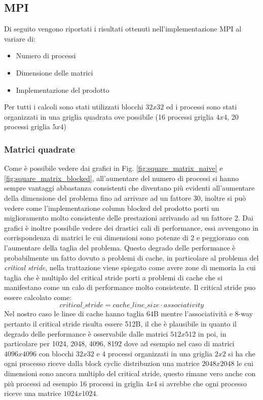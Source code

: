 \documentclass[conference]{IEEEtran}
\begin{document}
\subsection{MPI}
Di seguito vengono riportati i risultati ottenuti nell'implementazione MPI al variare di:
\begin{itemize}
    \item Numero di processi
    \item Dimensione delle matrici
    \item Implementazione del prodotto
\end{itemize}
Per tutti i calcoli sono stati utilizzati blocchi $32x32$ ed i processi sono stati organizzati in una griglia quadrata ove possibile (16 processi griglia $4x4$, 20 processi griglia $5x4$)

\subsubsection{Matrici quadrate}
Come è possibile vedere dai grafici in Fig. \ref{fig:square_matrix_naive} e \ref{fig:square_matrix_blocked}, all'aumentare del numero di processi si hanno sempre vantaggi abbastanza consistenti che diventano più evidenti all'aumentare della dimensione del problema fino ad arrivare ad un fattore 30, inoltre si può vedere come l'implementazione column blocked del prodotto porti un miglioramento molto consistente delle prestazioni arrivando ad un fattore 2. Dai grafici è inoltre possibile vedere dei drastici cali di performance, essi avvengono in corrispondenza di matrici le cui dimensioni sono potenze di 2 e peggiorano con l'aumentare della taglia del problema. Questo degrado delle performance è probabilmente un fatto dovuto a problemi di cache, in particolare al problema del \textit{critical stride}\cite{b1}, nella trattazione viene spiegato come avere zone di memoria la cui taglia che è multiplo del critical stride porti a problemi di cache che si manifestano come un calo di performance molto consistente. Il critical stride puo essere calcolato come:
\begin{equation}
    critical\_stride = cache\_line\_size \cdot associativity
\end{equation}
Nel nostro caso le linee di cache hanno taglia 64B mentre l'associatività e 8-way pertanto il critical stride risulta essere 512B, il che è plausibile in quanto il degrado delle performance è osservabile dalle matrici $512x512$ in poi, in particolare per 1024, 2048, 4096, 8192 dove ad esempio nel caso di matrici $4096x4096$ con blocchi $32x32$ e 4 processi organizzati in una griglia $2x2$ si ha che ogni processo riceve dalla block cyclic distribuzion una matrice $2048x2048$ le cui dimensioni sono ancora multiplo del critical stride, questo rimane vero anche con più processi ad esempio 16 processi in griglia $4x4$ si avrebbe che ogni processo riceve una matrice $1024x1024$.
\end{document}
